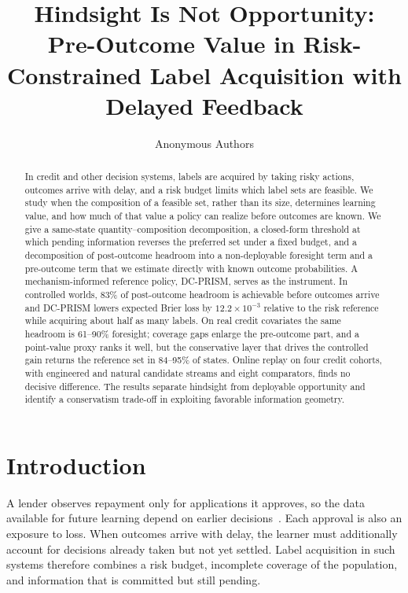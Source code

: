 \documentclass[runningheads]{llncs}
\begin{document}
\title{Hindsight Is Not Opportunity: Pre-Outcome Value in Risk-Constrained Label Acquisition with Delayed Feedback}
\author{Anonymous Authors}
\maketitle
\begin{abstract}
In credit and other decision systems, labels are acquired by taking risky actions, outcomes arrive with delay, and a risk budget limits which label sets are feasible. We study when the composition of a feasible set, rather than its size, determines learning value, and how much of that value a policy can realize before outcomes are known. We give a same-state quantity--composition decomposition, a closed-form threshold at which pending information reverses the preferred set under a fixed budget, and a decomposition of post-outcome headroom into a non-deployable foresight term and a pre-outcome term that we estimate directly with known outcome probabilities. A mechanism-informed reference policy, DC-PRISM, serves as the instrument. In controlled worlds, 83\% of post-outcome headroom is achievable before outcomes arrive and DC-PRISM lowers expected Brier loss by $12.2\times10^{-3}$ relative to the risk reference while acquiring about half as many labels. On real credit covariates the same headroom is 61--90\% foresight; coverage gaps enlarge the pre-outcome part, and a point-value proxy ranks it well, but the conservative layer that drives the controlled gain returns the reference set in 84--95\% of states. Online replay on four credit cohorts, with engineered and natural candidate streams and eight comparators, finds no decisive difference. The results separate hindsight from deployable opportunity and identify a conservatism trade-off in exploiting favorable information geometry.
\end{abstract}

\section{Introduction}
\label{sec:intro}
A lender observes repayment only for applications it approves, so the data available for future learning depend on earlier decisions~\cite{lakkaraju2017selective,wei2021selective}. Each approval is also an exposure to loss. When outcomes arrive with delay, the learner must additionally account for decisions already taken but not yet settled. Label acquisition in such systems therefore combines a risk budget, incomplete coverage of the population, and information that is committed but still pending.
\end{document}
